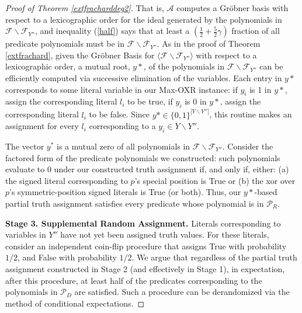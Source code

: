 \documentclass{article}
\begin{document}
\begin{proof}[Proof of Theorem \ref{extfracharddeg2}]
That is, $\mathcal{A}$ computes a Gr\"{o}bner basis with respect to a lexicographic order for the ideal generated by the polynomials in $\mathcal{F}\backslash \mathcal{F}_{Y''}$, and inequality (\ref{half}) says that at least a $(\frac{1}{2}+\frac{5}{2}\gamma)$ fraction of all predicate polynomials must be in $\mathcal{F}\backslash \mathcal{F}_{Y''}$. 
As in the proof of Theorem \ref{extfrachard}, given the Gr\"{o}bner Basis for $\langle\mathcal{F}\backslash \mathcal{F}_{Y''}\rangle$ with respect to a lexicographic order, a mutual root, $y*$, of the polynomials in $\mathcal{F}\backslash \mathcal{F}_{Y''}$ can be efficiently computed via successive elimination of the variables. Each entry in $y*$ corresponds to some literal variable in our Max-OXR instance:
if $y_i$ is 1 in $y*$, assign the corresponding literal $l_i$ to be true, if $y_i$ is 0 in $y*$, assign the corresponding literal $l_i$ to be false. Since $y*\in \{0,1\}^{|Y\backslash Y''|}$, this routine makes an assignment for every $l_i$ corresponding to a  $y_i \in Y\backslash Y''$. 

The vector $y^*$ is a mutual zero of all polynomials in $\mathcal{F}\backslash \mathcal{F}_{Y''}$.
Consider the factored form of the predicate polynomials we constructed: such polynomials evaluate to 0 under our constructed truth assignment if, and only if, either: (a) the signed literal corresponding to $p$'s special position is True or (b) the xor over $p$'s symmetric-position signed literals is True (or both). Thus, 
our $y*$-based partial truth assignment satisfies every predicate whose polynomial is in $\mathcal{P}_R$.

\vspace{2mm}

\noindent \textbf{Stage 3. Supplemental Random Assignment.} Literals corresponding to variables in $Y''$ have not yet been assigned truth values. For these literals, consider an independent coin-flip procedure that assigns True with probability $1/2$, and False with probability $1/2$. We argue that regardless of the partial truth assignment constructed in Stage 2 (and effectively in Stage 1), in expectation, after this procedure, at least half of the predicates corresponding to the polynomials in $\mathcal{P}_D$ are satisfied. Such a procedure can be derandomized via the method of conditional expectations.


\end{proof}
\end{document}
